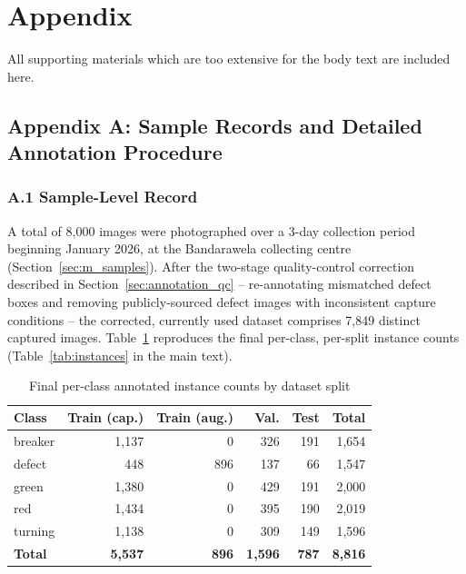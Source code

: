 \section*{Appendix}

All supporting materials which are too extensive for the body text are included here.

\subsection*{Appendix A: Sample Records and Detailed Annotation Procedure}

\subsubsection*{A.1 Sample-Level Record}

A total of 8{,}000 images were photographed over a 3-day collection period beginning January 2026, at the Bandarawela collecting centre (Section~\ref{sec:m_samples}). After the two-stage quality-control correction described in Section~\ref{sec:annotation_qc} -- re-annotating mismatched defect boxes and removing publicly-sourced defect images with inconsistent capture conditions -- the corrected, currently used dataset comprises 7{,}849 distinct captured images. Table~\ref{tab:appendixA_samples} reproduces the final per-class, per-split instance counts (Table~\ref{tab:instances} in the main text).

\begin{table}[H]
\caption{Final per-class annotated instance counts by dataset split}
\label{tab:appendixA_samples}
\centering
\begin{tabular}{lrrrrr}
\toprule
\textbf{Class} & \textbf{Train (cap.)} & \textbf{Train (aug.)} & \textbf{Val.} & \textbf{Test} & \textbf{Total} \\
\midrule
breaker & 1{,}137 & 0   & 326 & 191 & 1{,}654 \\
defect  & 448   & 896 & 137 & 66  & 1{,}547 \\
green   & 1{,}380 & 0   & 429 & 191 & 2{,}000 \\
red     & 1{,}434 & 0   & 395 & 190 & 2{,}019 \\
turning & 1{,}138 & 0   & 309 & 149 & 1{,}596 \\
\midrule
\textbf{Total} & \textbf{5{,}537} & \textbf{896} & \textbf{1{,}596} & \textbf{787} & \textbf{8{,}816} \\
\bottomrule
\end{tabular}
\end{table}

